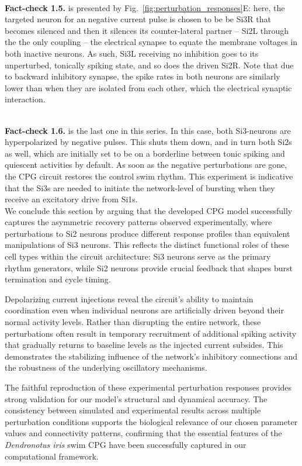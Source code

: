 \documentclass[nofootinbib,aip,amsmath,amssymb,reprint,twocolumn,10pt]{revtex4-2}
\begin{document}
~\\
{\bf Fact-check 1.5.} is presented by Fig.~\ref{fig:perturbation_responses}E: here, the targeted neuron for an negative current pulse is chosen to be be Si3R  that becomes silenced and then it silences its counter-lateral partner -- Si2L through the the only coupling -- the electrical synapse to equate the membrane voltages in both inactive neurons. As such, Si3L receiving no inhibition goes to its unperturbed, tonically spiking state, and so does the driven Si2R. Note that due to backward inhibitory synapse, the spike rates in both neurons are similarly lower than when they are isolated from each other, which the electrical synaptic interaction.   

~\\
{\bf Fact-check 1.6.} is the last one in this series. In this case, both Si3-neurons are hyperpolarized by negative pulses. This shuts them down, and in turn both Si2s as well, which are initially set to be on a borderline between tonic spiking and quiescent activities by default.  As soon as the negative perturbations are gone, the CPG circuit restores the control swim rhythm. This experiment is indicative that the Si3s are needed to initiate the network-level of bursting when they receive an excitatory drive from Si1s.  \\   


We conclude this section by arguing that the developed CPG model successfully captures the asymmetric recovery patterns observed experimentally, where perturbations to Si2 neurons produce different response profiles than equivalent manipulations of Si3 neurons. This reflects the distinct functional roles of these cell types within the circuit architecture: Si3 neurons serve as the primary rhythm generators, while Si2 neurons provide crucial feedback that shapes burst termination and cycle timing.

Depolarizing current injections reveal the circuit's ability to maintain coordination even when individual neurons are artificially driven beyond their normal activity levels. Rather than disrupting the entire network, these perturbations often result in temporary recruitment of additional spiking activity that gradually returns to baseline levels as the injected current subsides. This demonstrates the stabilizing influence of the network's inhibitory connections and the robustness of the underlying oscillatory mechanisms.

The faithful reproduction of these experimental perturbation responses provides strong validation for our model's structural and dynamical accuracy. The consistency between simulated and experimental results across multiple perturbation conditions supports the biological relevance of our chosen parameter values and connectivity patterns, confirming that the essential features of the \textit{Dendronotus iris} swim CPG have been successfully captured in our computational framework.
\end{document}
